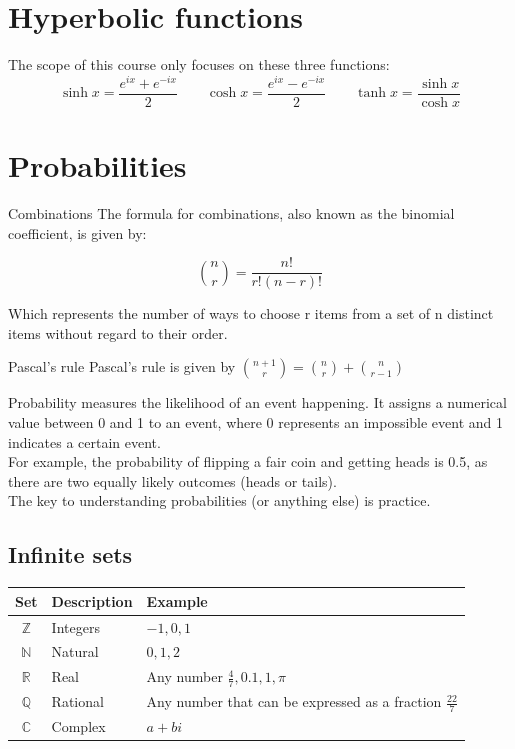 \documentclass{article}
\begin{document}
\section{Hyperbolic functions}
The scope of this course only focuses on these three functions:
\[\sinh x=\frac{e^{ix}+e^{-ix}}{2}\quad\quad\cosh x=\frac{e^{ix}-e^{-ix}}{2}\quad\quad\tanh x=\frac{\sinh x}{\cosh x}\]

\section{Probabilities}
\begin{knBox}[]{Combinations}
    The formula for combinations, also known as the binomial coefficient, is given by:

    \[
        \binom{n}{r} = \frac{n!}{r!(n-r)!}
    \]

    Which represents the number of ways to choose r items from a set of n distinct items without regard to their order.
\end{knBox}

\begin{definition}[]{Pascal's rule}
    Pascal's rule is given by $\binom{n+1}{r}=\binom{n}{r}+\binom{n}{r-1}$
\end{definition}
Probability measures the likelihood of an event happening. It assigns a numerical value between 0 and 1 to an event, where 0 represents an impossible event and 1 indicates a certain event.\\For example, the probability of flipping a fair coin and getting heads is 0.5, as there are two equally likely outcomes (heads or tails).\\The key to understanding probabilities (or anything else) is practice.

\subsection{Infinite sets}
\begin{table}[ht]
    \begin{tabular}{|c|l|l|}
        \hline
        \textbf{Set} & \textbf{Description} & \textbf{Example}                                              \\
        \hline
        $\mathds{Z}$ & Integers             & $-1,0,1$                                                      \\
        \hline
        $\mathds{N}$ & Natural              & $0,1,2$                                                       \\
        \hline
        $\mathds{R}$ & Real                 & Any number $\frac{4}{7}, 0.1, 1, \pi$                         \\
        \hline
        $\mathds{Q}$ & Rational             & Any number that can be expressed as a fraction $\frac{22}{7}$ \\
        \hline
        $\mathds{C}$ & Complex              & $a+bi$                                                        \\
        \hline
    \end{tabular}
\end{table}
\end{document}
